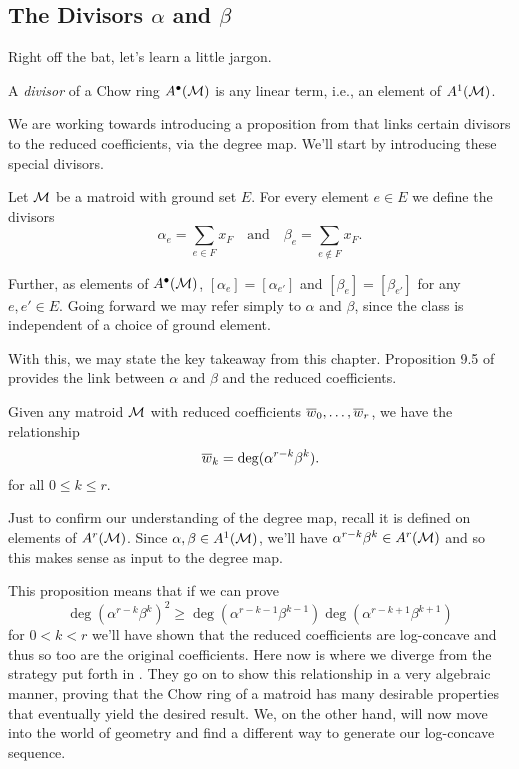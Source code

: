 \documentclass[12pt,oneside]{../../sfsuthesis}
\begin{document}
\subsection{The Divisors \texorpdfstring{\( \alpha \)}{alpha} and \texorpdfstring{\( \beta \)}{beta}}
Right off the bat, let's learn a little jargon.
\begin{definition}[Divisor]
    A \emph{divisor} of a Chow ring \( A^\bullet(\mathcal{M}) \) is any linear term, i.e., an element of \( A^1(\mathcal{M}) \).
\end{definition}
We are working towards introducing a proposition from \cite{adiprasitoHodgeTheoryCombinatorial2018} that links certain divisors to the reduced coefficients, via the degree map.
We'll start by introducing these special divisors.
\begin{definition}\label{def:alphaBeta}
    Let \( \mathcal{M} \) be a matroid with ground set \( E \).
    For every element \( e \in E \) we define the divisors
    \[
        \alpha_e = \sum_{e \in F} x_F \quad \text{and} \quad \beta_e = \sum_{e \notin F}x_F.
    \]

    Further, as elements of \( A^\bullet(\mathcal{M}) \), \([\alpha_{e}] = [\alpha_{e'}] \) and \([\beta_{e}] = [\beta_{e'}] \) for any \( e, e' \in E \).
    Going forward we may refer simply to \( \alpha \) and \( \beta \), since the class is independent of a choice of ground element.
\end{definition}

With this, we may state the key takeaway from this chapter.
Proposition 9.5 of \cite{adiprasitoHodgeTheoryCombinatorial2018} provides the link between \( \alpha \) and \( \beta \) and the reduced coefficients.
\begin{proposition}\th\label{thm:coeffIsDeg}
    Given any matroid \( \mathcal{M} \) with reduced coefficients \( \overline{w}_0, \dots, \overline{w}_r \), we have the relationship
    \[
        \overline{w}_k = \deg(\alpha^{r-k}\beta^k).
    \]
    for all \( 0 \leq k \leq r \).
\end{proposition}
Just to confirm our understanding of the degree map, recall it is defined on elements of \( A^r(\mathcal{M}) \).
Since \( \alpha, \beta \in A^1(\mathcal{M})\), we'll have \( \alpha^{r-k}\beta^k \in A^r(\mathcal{M}) \) and so this makes sense as input to the degree map.

This proposition means that if we can prove
\[
    \deg(\alpha^{r-k}\beta^k)^2 \geq \deg(\alpha^{r-k-1}\beta^{k-1}) \deg(\alpha^{r-k+1}\beta^{k+1})
\]
for \( 0 < k < r \) we'll have shown that the reduced coefficients are log-concave and thus so too are the original coefficients.
Here now is where we diverge from the strategy put forth in \cite{adiprasitoHodgeTheoryCombinatorial2018}.
They go on to show this relationship in a very algebraic manner, proving that the Chow ring of a matroid has many desirable properties that eventually yield the desired result.
We, on the other hand, will now move into the world of geometry and find a different way to generate our log-concave sequence.
\end{document}
